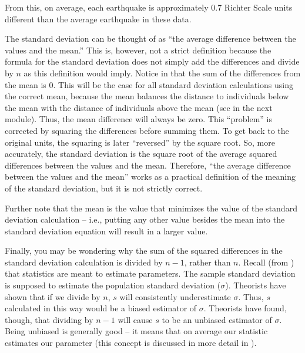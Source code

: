 \documentclass[10pt,openany]{book}\usepackage[]{graphicx}\usepackage[]{color}
\begin{document}
From this, on average, each earthquake is approximately 0.7 Richter Scale units different than the average earthquake in these data.


\vspace{-12pt}

The standard deviation can be thought of as ``the average difference between the values and the mean.'' This is, however, not a strict definition because the formula for the standard deviation does not simply add the differences and divide by $n$ as this definition would imply. Notice in  that the sum of the differences from the mean is 0. This will be the case for all standard deviation calculations using the correct mean, because the mean balances the distance to individuals below the mean with the distance of individuals above the mean (see  in the next module). Thus, the mean difference will always be zero. This ``problem'' is corrected by squaring the differences before summing them. To get back to the original units, the squaring is later ``reversed'' by the square root. So, more accurately, the standard deviation is the square root of the average squared differences between the values and the mean. Therefore, ``the average difference between the values and the mean'' works as a practical definition of the meaning of the standard deviation, but it is not strictly correct.


Further note that the mean is the value that minimizes the value of the standard deviation calculation -- i.e., putting any other value besides the mean into the standard deviation equation will result in a larger value.

Finally, you may be wondering why the sum of the squared differences in the standard deviation calculation is divided by $n-1$, rather than $n$. Recall (from ) that statistics are meant to estimate parameters. The sample standard deviation is supposed to estimate the population standard deviation ($\sigma$). Theorists have shown that if we divide by $n$, $s$ will consistently underestimate $\sigma$. Thus, $s$ calculated in this way would be a biased estimator of $\sigma$. Theorists have found, though, that dividing by $n-1$ will cause $s$ to be an unbiased estimator of $\sigma$. Being unbiased is generally good -- it means that on average our statistic estimates our parameter (this concept is discussed in more detail in ).
\end{document}
